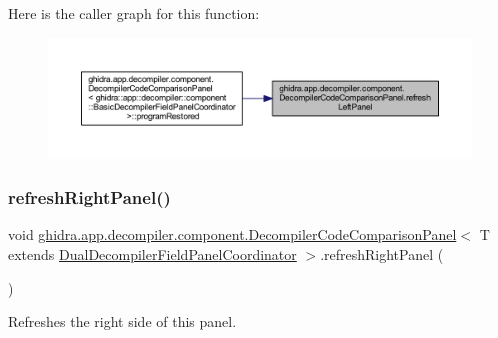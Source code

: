 Here is the caller graph for this function\+:
\nopagebreak
\begin{figure}[H]
\begin{center}
\leavevmode
\includegraphics[width=350pt]{classghidra_1_1app_1_1decompiler_1_1component_1_1_decompiler_code_comparison_panel_a3518b9df13555c5e6d32993f17a65a37_icgraph}
\end{center}
\end{figure}
\mbox{\label{classghidra_1_1app_1_1decompiler_1_1component_1_1_decompiler_code_comparison_panel_a72394cb529eca4eb319b00695288cec9}} 
\subsubsection{\texorpdfstring{refreshRightPanel()}{refreshRightPanel()}}
{\footnotesize\ttfamily void \mbox{\hyperlink{classghidra_1_1app_1_1decompiler_1_1component_1_1_decompiler_code_comparison_panel}{ghidra.\+app.\+decompiler.\+component.\+Decompiler\+Code\+Comparison\+Panel}}$<$ T extends \mbox{\hyperlink{classghidra_1_1app_1_1decompiler_1_1component_1_1_dual_decompiler_field_panel_coordinator}{Dual\+Decompiler\+Field\+Panel\+Coordinator}} $>$.refresh\+Right\+Panel (\begin{DoxyParamCaption}{ }\end{DoxyParamCaption})\hspace{0.3cm}{\ttfamily [inline]}}

Refreshes the right side of this panel. 

